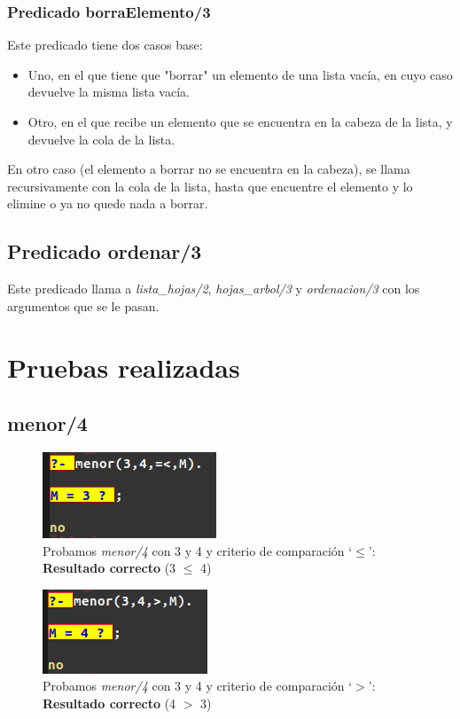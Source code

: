 \documentclass[12pt, a4paper, spanish]{article}
\begin{document}
\subsubsection{Predicado borraElemento/3}


Este predicado tiene dos casos base:

\begin{itemize}
	\item Uno, en el que tiene que "borrar" un elemento de una lista vacía, en cuyo caso devuelve la misma lista vacía.
	
	\item Otro, en el que recibe un elemento que se encuentra en la cabeza de la lista, y devuelve la cola de la lista.
\end{itemize}

En otro caso (el elemento a borrar no se encuentra en la cabeza), se llama recursivamente con la cola de la lista, hasta que encuentre el elemento y lo elimine o ya no quede nada a borrar.

\subsection{Predicado ordenar/3}


Este predicado llama a \textit{lista\_hojas/2}, \textit{hojas\_arbol/3} y \textit{ordenacion/3} con los argumentos que se le pasan.
\newpage

\section{Pruebas realizadas}
\subsection{menor/4}
\begin{multicols}{2}
	\begin{figure}[H]
		\centering
		\includegraphics{images/menor1.png}
		\caption{Probamos \textit{menor/4} con 3 y 4 y criterio de comparación `$\leq$': \textbf{Resultado correcto} (3 $\leq$ 4)}
	\end{figure}
	\begin{figure}[H]
		\includegraphics{images/menor2.png}
		\caption{Probamos \textit{menor/4} con 3 y 4 y criterio de comparación `$>$': \textbf{Resultado correcto} (4 $>$ 3)}
	\end{figure}
\end{multicols}
\end{document}
